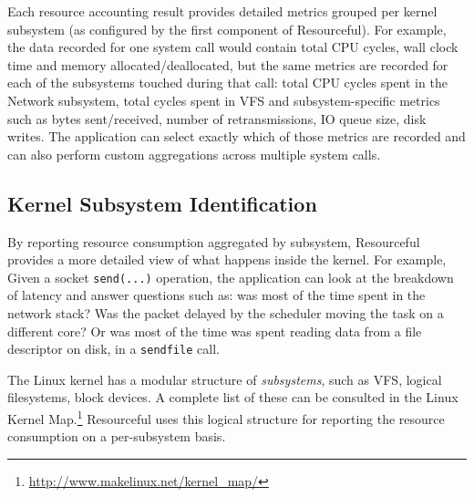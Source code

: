 \documentclass[letterpaper,twocolumn,10pt]{article}
\newcommand{\pname}{Resourceful}
\newcommand{\lnote}[1]{\textcolor{red}{[\textit{#1}]}} %
\begin{document}
Each resource accounting result provides detailed metrics grouped per kernel
subsystem (as configured by the first component of \pname). For example, the
data recorded for one system call would contain total CPU cycles, wall clock
time and memory allocated/deallocated, but the same metrics are recorded for
each of the subsystems touched during that call: total CPU cycles spent in the
Network subsystem, total cycles spent in VFS and subsystem-specific metrics such
as bytes sent/received, number of retransmissions, IO queue size, disk writes.
The application can select exactly which of those metrics are recorded and can
also perform custom aggregations across multiple system calls.

\subsection{Kernel Subsystem Identification}
By reporting resource consumption aggregated by subsystem, Resourceful provides
a more detailed view of what happens inside the kernel. For example,  Given a
socket \texttt{send(...)} operation, the application can look at the breakdown
of latency and answer questions such as: was most of the time spent in the
network stack? Was the packet delayed by the scheduler moving the task on a
different core? Or was most of the time was spent reading data from a file
descriptor on disk, in a \texttt{sendfile} call.
 
The Linux kernel has a modular structure of \emph{subsystems}, such as VFS,
logical filesystems, block devices. A complete list of these can be consulted in
the Linux Kernel Map.\footnote{\url{http://www.makelinux.net/kernel_map/}}
\pname{ }uses this logical structure for reporting the resource consumption on a
per-subsystem basis. 


\end{document}
